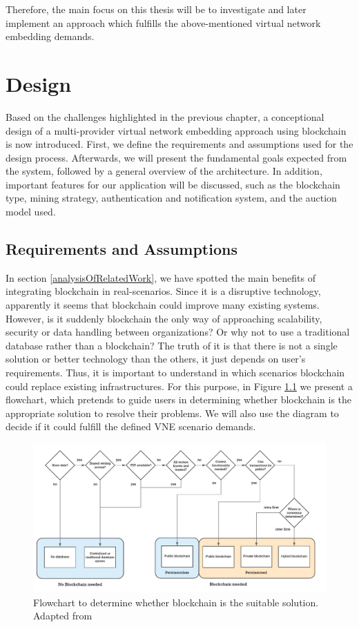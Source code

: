 Therefore, the main focus on this thesis will be to investigate and later implement an approach which fulfills the above-mentioned virtual network embedding demands.


\chapter{Design}
\label{ch:design}

Based on the challenges highlighted in the previous chapter, a conceptional design of a multi-provider virtual network embedding approach using blockchain is now introduced. First, we define the requirements and assumptions used for the design process. Afterwards, we will present the fundamental goals expected from the system, followed by a general overview of the architecture. In addition, important features for our application will be discussed, such as the blockchain type, mining strategy, authentication and notification system, and the auction model used.

\section{Requirements and Assumptions}

In section \ref{analysisOfRelatedWork}, we have spotted the main benefits of integrating blockchain in real-scenarios. Since it is a disruptive technology, apparently it seems that blockchain could improve many existing systems. However, is it suddenly blockchain the only way of approaching scalability, security or data handling between organizations? Or why not to use a traditional database rather than a blockchain? The truth of it is that there is not a single solution or better technology than the others, it just depends on user's requirements. Thus, it is important to understand in which scenarios blockchain could replace existing infrastructures. For this purpose, in Figure \ref{fig:bcFlowchart} we present a flowchart, which pretends to guide users in determining whether blockchain is the appropriate solution to resolve their problems. We will also use the diagram to decide if it could fulfill the defined VNE scenario demands. 

\begin{figure}[bth]
	\centering
	\includegraphics[width=1\linewidth]{gfx/bcFlowchart}    
  	\caption{Flowchart to determine whether blockchain is the suitable solution. Adapted from \citep{wust2017you}}
  	\label{fig:bcFlowchart}
\end{figure}

